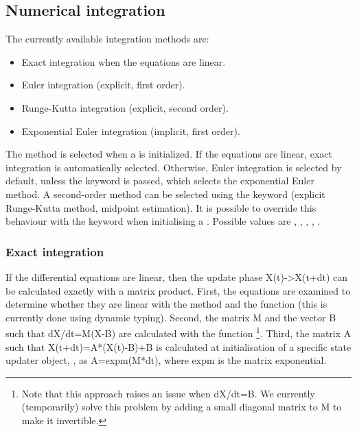 \documentclass[letterpaper,10pt,english]{manual}
\begin{document}
\subsection{Numerical integration}

The currently available integration methods are:
\begin{itemize}
\item {} 
Exact integration when the equations are linear.

\item {} 
Euler integration (explicit, first order).

\item {} 
Runge-Kutta integration (explicit, second order).

\item {} 
Exponential Euler integration (implicit, first order).

\end{itemize}

The method is selected when a \hyperlink{brian.NeuronGroup}{} is initialized.
If the equations are linear, exact integration is automatically selected.
Otherwise, Euler integration is selected by default, unless the keyword
 is passed, which selects the exponential Euler method. A second-order method
can be selected using the keyword  (explicit Runge-Kutta method, midpoint estimation).
It is possible to override this behaviour with the  keyword when initialising
a \hyperlink{brian.NeuronGroup}{}. Possible values are , ,
, , .

\hypertarget{index-10}{}\subsubsection{Exact integration}

If the differential equations are linear, then the update phase
X(t)-\textgreater{}X(t+dt) can be calculated exactly with a matrix product.
First, the equations are examined to determine whether they are linear
with the method  and the function
 (this is currently done using dynamic typing).
Second, the matrix M and the vector B such that dX/dt=M(X-B) are calculated with
the function  \footnote{
Note that this approach raises an issue when dX/dt=B. We currently (temporarily)
solve this problem by adding a small diagonal matrix to M to make it invertible.
}.
Third, the matrix A such that X(t+dt)=A*(X(t)-B)+B is calculated at initialisation
of a specific state updater object, \hyperlink{brian.LinearStateUpdater}{},
as A=expm(M*dt), where expm is the matrix exponential.
\end{document}
